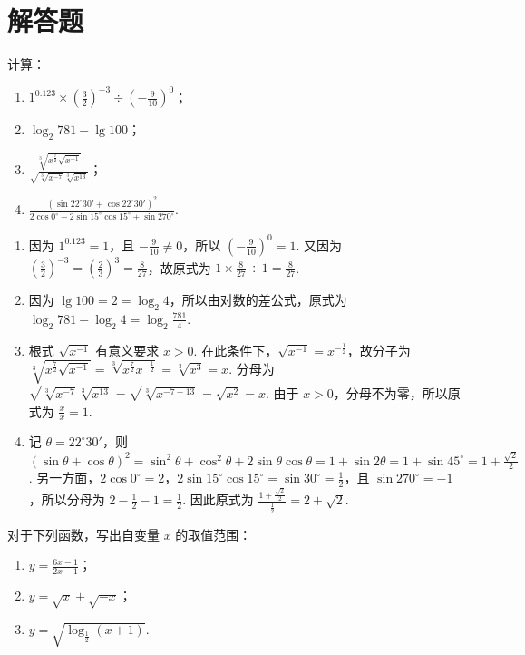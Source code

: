 \section{解答题}

\begin{problem}
计算：
\begin{enumerate}
  \item \(1^{0.123}\times\left(\frac{3}{2}\right)^{-3}\div\left(-\frac{9}{10}\right)^{0}\)；
  \item \(\log_{2}781-\lg100\)；
  \item \(\frac{\sqrt[3]{x^{\frac{7}{2}}\sqrt{x^{-1}}}}{\sqrt{\sqrt[3]{x^{-7}}\sqrt[3]{x^{13}}}}\)；
  \item \(\frac{\left(\sin22^{\circ}30'+\cos22^{\circ}30'\right)^{2}}{2\cos0^{\circ}-2\sin15^{\circ}\cos15^{\circ}+\sin270^{\circ}}\).
\end{enumerate}
\end{problem}

\begin{solution}
\begin{enumerate}
  \item 因为 \(1^{0.123}=1\)，且 \(-\frac{9}{10}\neq0\)，所以 \(\left(-\frac{9}{10}\right)^0=1\). 又因为 \(\left(\frac{3}{2}\right)^{-3}=\left(\frac{2}{3}\right)^3=\frac{8}{27}\)，故原式为 \(1\times\frac{8}{27}\div1=\frac{8}{27}\).
  \item 因为 \(\lg100=2=\log_{2}4\)，所以由对数的差公式，原式为 \(\log_{2}781-\log_{2}4=\log_{2}\frac{781}{4}\).
  \item 根式 \(\sqrt{x^{-1}}\) 有意义要求 \(x>0\). 在此条件下，\(\sqrt{x^{-1}}=x^{-\frac12}\)，故分子为 \(\sqrt[3]{x^{\frac72}\sqrt{x^{-1}}}=\sqrt[3]{x^{\frac72}x^{-\frac12}}=\sqrt[3]{x^3}=x\). 分母为 \(\sqrt{\sqrt[3]{x^{-7}}\sqrt[3]{x^{13}}}=\sqrt{\sqrt[3]{x^{-7+13}}}=\sqrt{x^2}=x\). 由于 \(x>0\)，分母不为零，所以原式为 \(\frac{x}{x}=1\).
  \item 记 \(\theta=22^{\circ}30'\)，则 \(\left(\sin\theta+\cos\theta\right)^2=\sin^2\theta+\cos^2\theta+2\sin\theta\cos\theta=1+\sin2\theta=1+\sin45^{\circ}=1+\frac{\sqrt2}{2}\). 另一方面，\(2\cos0^{\circ}=2\)，\(2\sin15^{\circ}\cos15^{\circ}=\sin30^{\circ}=\frac12\)，且 \(\sin270^{\circ}=-1\)，所以分母为 \(2-\frac12-1=\frac12\). 因此原式为 \(\frac{1+\frac{\sqrt2}{2}}{\frac12}=2+\sqrt2\).
\end{enumerate}
\end{solution}

\begin{problem}
对于下列函数，写出自变量 \(x\) 的取值范围：
\begin{enumerate}
  \item \(y=\frac{6x-1}{2x-1}\)；
  \item \(y=\sqrt{x}+\sqrt{-x}\)；
  \item \(y=\sqrt{\log_{\frac{1}{2}}(x+1)}\).
\end{enumerate}
\end{problem}

